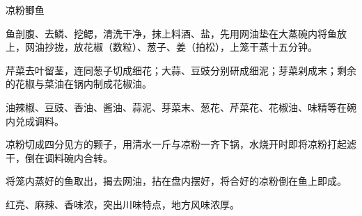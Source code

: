 %
%
%
%
%
%
%
\begin{recipe}{凉粉鲫鱼}

\ingredients


\preparation

\step 鱼剖腹、去鳞、挖鳃，清洗干净，抹上料酒、盐，先用网油垫在大蒸碗内将鱼放
上，网油抄拢，放花椒（数粒）、葱子、姜（拍松），上笼干蒸十五分钟。

\step 芹菜去叶留茎，连同葱子切成细花；大蒜、豆豉分别研成细泥；芽菜剁成末；剩余
的花椒与菜油在锅内制成花\xeCJKnobreak{}椒油。

\step 油辣椒、豆豉、香油、酱油、蒜泥、芽菜末、葱花、芹菜花、花椒油、味精等在碗
内兑成调料。

\step 凉粉切成四分见方的颗子，用清水一斤与凉粉一齐下锅，水烧开时即将凉粉打起滤
干，倒在调料碗内合转。

\step 将笼内蒸好的鱼取出，揭去网油，拈在盘内摆好，将合好的凉粉倒在鱼上即成。

\features

红亮、麻辣、香味浓，突出川味特点，地方风味浓厚。

\end{recipe}

